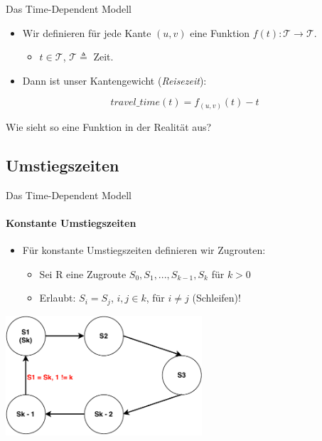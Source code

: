 \begin{frame}{Das Time-Dependent Modell}
	\begin{itemize}
		\item Wir definieren für jede Kante $(u,v)$ eine\* Funktion $f(t): \mathcal{T} \rightarrow \mathcal{T}$.
		\begin{itemize}
			\item $t \in \mathcal{T}$, $\mathcal{T} \triangleq$ Zeit.
		\end{itemize}
	\end{itemize}
	\vspace{2em}
	\pause
	\begin{itemize}
		\item Dann ist unser Kantengewicht (\textit{Reisezeit}):
	\end{itemize}
	
	\begin{equation*}
		travel\_time(t) = f_{(u,v)}(t) - t
	\end{equation*}

	\vspace{5em}
	\begin{block}{}
		Wie sieht so eine Funktion in der Realität aus?
	\end{block}
\end{frame}

\subsection{Umstiegszeiten}
\begin{frame}{Das Time-Dependent Modell}
	\framesubtitle{Konstante Umstiegszeiten}
	\begin{itemize}
		\item Für konstante Umstiegszeiten definieren wir Zugrouten:
		\begin{itemize}
			\item Sei R eine Zugroute $S_0,S_1,...,S_{k - 1}, S_k$ für $k > 0$
			\pause
			\item Erlaubt: $S_i = S_j$, $i,j \in k$, für $i \neq j$ (Schleifen)!
		\end{itemize}
	\end{itemize}
	
	\begin{center}
		\includegraphics[height=12em]{images/time-dependent/zugroute.pdf}
	\end{center}
\end{frame}


